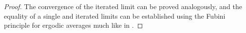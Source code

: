 \documentclass[11pt]{amsart}
\theoremstyle{definition}
\newcommand{\Z}{{\mathbb Z}}
\newcommand{\bm}{{\mathbf{m}}}
\newcommand{\1}{{\mathbf{1}}}
\newcommand{\floor}[1]{{\left \lfloor #1 \right \rfloor}}
\begin{document}
\begin{proof}

    The convergence of the iterated limit can be proved analogously, and the equality of a single and iterated limits can be established using the Fubini principle for ergodic averages \cite[Lemma 1.1]{BL15} much like in \cite[Lemma 3.1]{DKKST24}.
\end{proof}
\end{document}
